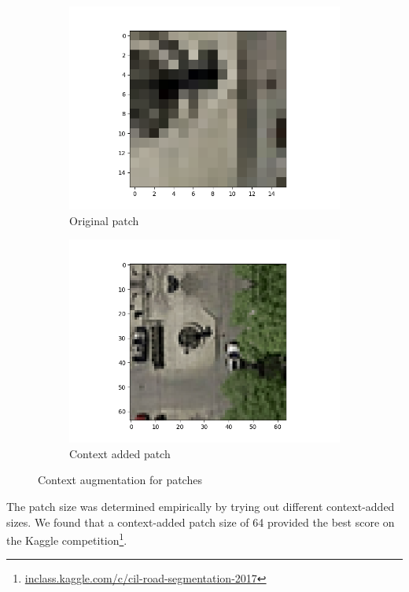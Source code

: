 \documentclass[10pt,conference,compsocconf]{IEEEtran}
\begin{document}
\begin{figure}
\centering
\begin{subfigure}{.5\columnwidth}
  \centering
  \includegraphics[width=.8\linewidth]{orig_patch.png}
  \caption{Original patch}
\end{subfigure}%
\begin{subfigure}{.5\columnwidth}
  \centering
  \includegraphics[width=\linewidth]{cont_added_patch.png}
  \caption{Context added patch}
\end{subfigure}
\caption{Context augmentation for patches}
\label{fig:patches}
\end{figure}

The patch size was determined empirically by trying out different context-added
sizes. We found that a context-added patch size of 64 provided the best score
on the Kaggle
competition\footnote{\url{inclass.kaggle.com/c/cil-road-segmentation-2017}}.
\end{document}
